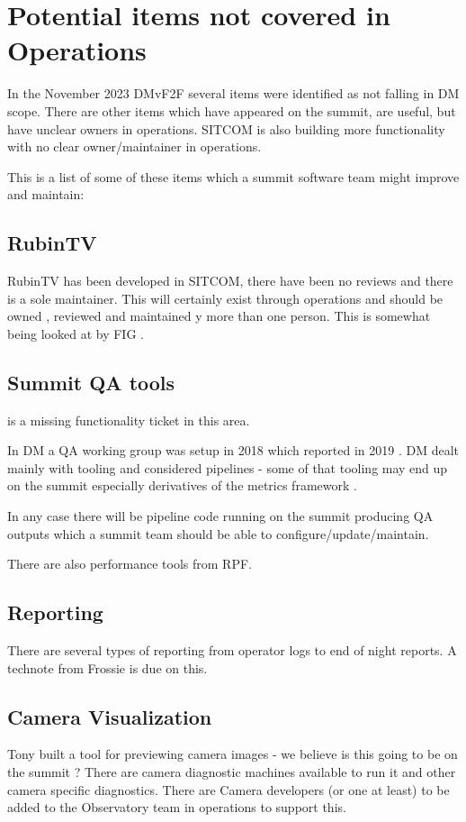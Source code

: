 \section{Potential items not covered in \gls{Operations}} \label{sec:items}

In the November 2023 DMvF2F several items were identified as not falling in \gls{DM} scope.
There are other items which have appeared on the summit, are useful, but have unclear owners in operations.
\gls{SITCOM} is also building more functionality with no clear owner/maintainer in operations.

This is a list of some of these items which a summit \gls{software} team might improve and maintain:

\subsection{ RubinTV }
 RubinTV  has been developed in \gls{SITCOM}, there have been no reviews and there is a sole maintainer.
This will certainly exist through operations and should be owned , reviewed and maintained y more than one person.
This is somewhat being looked at by FIG .

\subsection{ Summit \gls{QA} tools}
 is a missing functionality ticket in this area.

In DM a \gls{QA} working group was setup in 2018  which reported in 2019 .
DM dealt mainly with tooling and considered pipelines - some of that tooling may end up on the summit especially derivatives of the metrics framework .

In any case there will be pipeline code running on the summit producing QA outputs which a summit team should be able to configure/update/maintain.

There are also performance tools from RPF.




\subsection{ Reporting }

There are several types of reporting from operator logs to end of night reports.
A technote from Frossie is due on this.

\subsection{ \gls{Camera} Visualization}
Tony built a tool for previewing camera images - we believe is this going to be on the summit ?
There are camera diagnostic machines available to run it and other camera specific diagnostics.
There are Camera developers (or one at least) to be added to the Observatory team in operations to support this.

